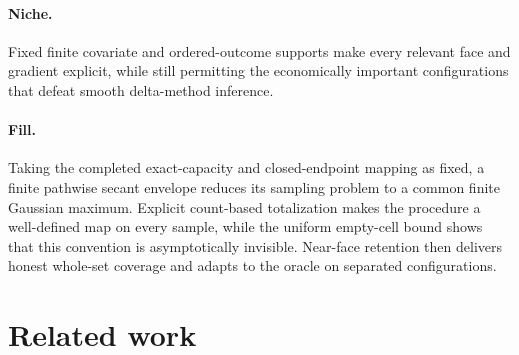 \documentclass{article}
\begin{document}
\paragraph{Niche.} Fixed finite covariate and ordered-outcome supports make every relevant face and gradient explicit, while still permitting the economically important configurations that defeat smooth delta-method inference.

\paragraph{Fill.} Taking the completed exact-capacity and closed-endpoint mapping as fixed, a finite pathwise secant envelope reduces its sampling problem to a common finite Gaussian maximum. Explicit count-based totalization makes the procedure a well-defined map on every sample, while the uniform empty-cell bound shows that this convention is asymptotically invisible. Near-face retention then delivers honest whole-set coverage and adapts to the oracle on separated configurations.

\section{Related work}
\end{document}
